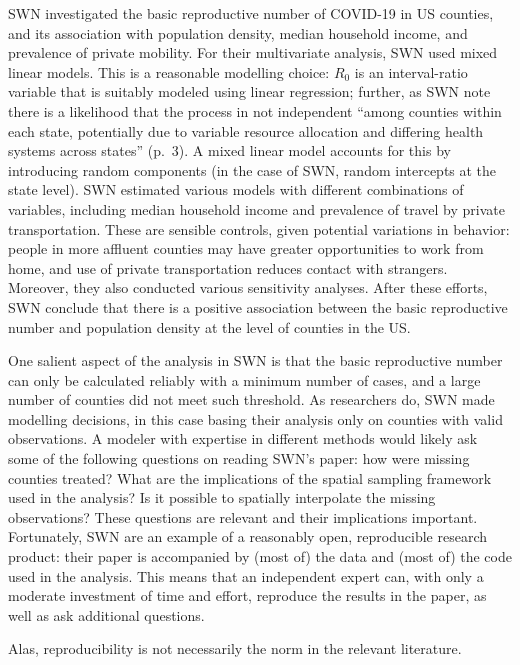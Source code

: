 \documentclass[]{elsarticle} %
\begin{document}
SWN investigated the basic reproductive number of COVID-19 in US
counties, and its association with population density, median household
income, and prevalence of private mobility. For their multivariate
analysis, SWN used mixed linear models. This is a reasonable modelling
choice: \(R_0\) is an interval-ratio variable that is suitably modeled
using linear regression; further, as SWN note there is a likelihood that
the process in not independent ``among counties within each state,
potentially due to variable resource allocation and differing health
systems across states'' (p.~3). A mixed linear model accounts for this
by introducing random components (in the case of SWN, random intercepts
at the state level). SWN estimated various models with different
combinations of variables, including median household income and
prevalence of travel by private transportation. These are sensible
controls, given potential variations in behavior: people in more
affluent counties may have greater opportunities to work from home, and
use of private transportation reduces contact with strangers. Moreover,
they also conducted various sensitivity analyses. After these efforts,
SWN conclude that there is a positive association between the basic
reproductive number and population density at the level of counties in
the US.

One salient aspect of the analysis in SWN is that the basic reproductive
number can only be calculated reliably with a minimum number of cases,
and a large number of counties did not meet such threshold. As
researchers do, SWN made modelling decisions, in this case basing their
analysis only on counties with valid observations. A modeler with
expertise in different methods would likely ask some of the following
questions on reading SWN's paper: how were missing counties treated?
What are the implications of the spatial sampling framework used in the
analysis? Is it possible to spatially interpolate the missing
observations? These questions are relevant and their implications
important. Fortunately, SWN are an example of a reasonably open,
reproducible research product: their paper is accompanied by (most of)
the data and (most of) the code used in the analysis. This means that an
independent expert can, with only a moderate investment of time and
effort, reproduce the results in the paper, as well as ask additional
questions.

Alas, reproducibility is not necessarily the norm in the relevant
literature.
\end{document}
